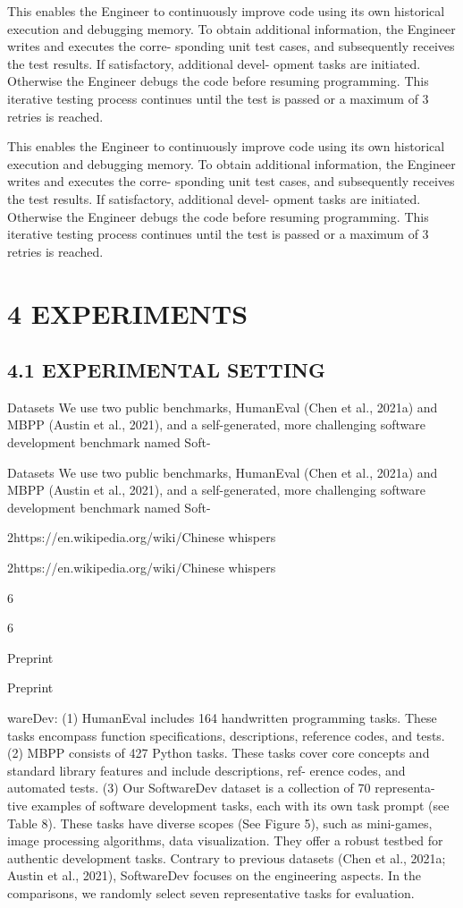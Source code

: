 \documentclass[12pt]{article}
\begin{document}
This enables the Engineer to continuously improve code using its own historical execution and
debugging memory. To obtain additional information, the Engineer writes and executes the corre-
sponding unit test cases, and subsequently receives the test results. If satisfactory, additional devel-
opment tasks are initiated. Otherwise the Engineer debugs the code before resuming programming.
This iterative testing process continues until the test is passed or a maximum of 3 retries is reached.


This enables the Engineer to continuously improve code using its own historical execution and
debugging memory. To obtain additional information, the Engineer writes and executes the corre-
sponding unit test cases, and subsequently receives the test results. If satisfactory, additional devel-
opment tasks are initiated. Otherwise the Engineer debugs the code before resuming programming.
This iterative testing process continues until the test is passed or a maximum of 3 retries is reached.


\section{4 EXPERIMENTS}


\subsection{4.1 EXPERIMENTAL SETTING}


Datasets We use two public benchmarks, HumanEval (Chen et al., 2021a) and MBPP (Austin
et al., 2021), and a self-generated, more challenging software development benchmark named Soft-


Datasets We use two public benchmarks, HumanEval (Chen et al., 2021a) and MBPP (Austin
et al., 2021), and a self-generated, more challenging software development benchmark named Soft-


2https://en.wikipedia.org/wiki/Chinese whispers


2https://en.wikipedia.org/wiki/Chinese whispers


6


6


Preprint


Preprint


wareDev: (1) HumanEval includes 164 handwritten programming tasks. These tasks encompass
function specifications, descriptions, reference codes, and tests. (2) MBPP consists of 427 Python
tasks. These tasks cover core concepts and standard library features and include descriptions, ref-
erence codes, and automated tests. (3) Our SoftwareDev dataset is a collection of 70 representa-
tive examples of software development tasks, each with its own task prompt (see Table 8). These
tasks have diverse scopes (See Figure 5), such as mini-games, image processing algorithms, data
visualization. They offer a robust testbed for authentic development tasks. Contrary to previous
datasets (Chen et al., 2021a; Austin et al., 2021), SoftwareDev focuses on the engineering aspects.
In the comparisons, we randomly select seven representative tasks for evaluation.
\end{document}
